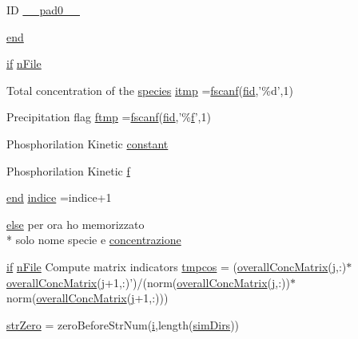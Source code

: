 \begin{DoxyCompactItemize}
\item 
I\+D \hyperlink{a00025_a1bd174db58293f9130ed98bb375ccc03}{\+\_\+\+\_\+pad0\+\_\+\+\_\+}
\item 
\hyperlink{a00025_afb358f48b1646c750fb9da6c6585be2b}{end}
\item 
\hyperlink{a00030_a01d55766b8058903dd360b4bda71f9f5}{if} \hyperlink{a00025_a0df074de7bfa18238647c0c8b555316e}{n\+File}
\item 
Total concentration of the \hyperlink{a00021}{species} \hyperlink{a00025_af17812863fb385a507b5b07ed6166569}{itmp} =\hyperlink{a00025_a028ac102a731e62fb0a7439381f566c1}{fscanf}(\hyperlink{a00031_ae9011d40c6f13e68e6f07156e0da7c5d}{fid},'\%d',1)
\item 
Precipitation flag \hyperlink{a00025_ad82fa813707dc406b75a0b6e38d45a3e}{ftmp} =\hyperlink{a00025_a028ac102a731e62fb0a7439381f566c1}{fscanf}(\hyperlink{a00031_ae9011d40c6f13e68e6f07156e0da7c5d}{fid},'\%\hyperlink{a00025_a9c5a71c46b1abb8b7df5ebeac6c81535}{f}',1)
\item 
Phosphorilation Kinetic \hyperlink{a00025_a163bb0e728c363ddfbd84725ee4bcbf1}{constant}
\item 
Phosphorilation Kinetic \hyperlink{a00025_a9c5a71c46b1abb8b7df5ebeac6c81535}{f}
\item 
\hyperlink{a00025_afb358f48b1646c750fb9da6c6585be2b}{end} \hyperlink{a00025_a776b2bbd08be028d44f6d4260f27633a}{indice} =indice+1
\item 
\hyperlink{a00031_af5946383720aa572eb93e1e63afc23c2}{else} per ora ho memorizzato \\*
solo nome specie e \hyperlink{a00025_a5acf1fa9f8d0cb2ab8b1505ffd4dce5b}{concentrazione}
\item 
\hyperlink{a00030_a01d55766b8058903dd360b4bda71f9f5}{if} \hyperlink{a00025_a0df074de7bfa18238647c0c8b555316e}{n\+File} Compute matrix indicators \hyperlink{a00025_ab6beb59ba238329bfb9d4ed5a5486c5e}{tmpcos} = (\hyperlink{a00025_a576dd8edd1b0fd4cc65709a59b308518}{overall\+Conc\+Matrix}(\hyperlink{a00110_ac86694252f8dfdb19aaeadc4b7c342c6}{j},\+:)$\ast$\hyperlink{a00025_a576dd8edd1b0fd4cc65709a59b308518}{overall\+Conc\+Matrix}(\hyperlink{a00110_ac86694252f8dfdb19aaeadc4b7c342c6}{j}+1,\+:)')/(norm(\hyperlink{a00025_a576dd8edd1b0fd4cc65709a59b308518}{overall\+Conc\+Matrix}(\hyperlink{a00110_ac86694252f8dfdb19aaeadc4b7c342c6}{j},\+:))$\ast$norm(\hyperlink{a00025_a576dd8edd1b0fd4cc65709a59b308518}{overall\+Conc\+Matrix}(\hyperlink{a00110_ac86694252f8dfdb19aaeadc4b7c342c6}{j}+1,\+:)))
\item 
\hyperlink{a00025_ab253e75f6224bf843e7a5ff2fb472e7d}{str\+Zero} = zero\+Before\+Str\+Num(\hyperlink{a00113_ad3efca1ea6e3333daf30719ee0501862}{i},length(\hyperlink{a00031_aae5035eb84b89176ed5b06e136325eff}{sim\+Dirs}))

\end{DoxyCompactItemize}

